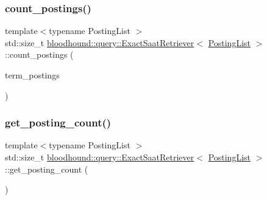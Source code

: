 \subsubsection{\texorpdfstring{count\+\_\+postings()}{count\_postings()}}
{\footnotesize\ttfamily template$<$typename Posting\+List $>$ \\
std\+::size\+\_\+t \mbox{\hyperlink{classbloodhound_1_1query_1_1ExactSaatRetriever}{bloodhound\+::query\+::\+Exact\+Saat\+Retriever}}$<$ \mbox{\hyperlink{classbloodhound_1_1PostingList}{Posting\+List}} $>$\+::count\+\_\+postings (\begin{DoxyParamCaption}\item[{const std\+::vector$<$ \mbox{\hyperlink{classbloodhound_1_1PostingList}{Posting\+List}} $>$ \&}]{term\+\_\+postings }\end{DoxyParamCaption})\hspace{0.3cm}{\ttfamily [inline]}}

\mbox{\label{classbloodhound_1_1query_1_1ExactSaatRetriever_a43b6bd8cdc3a64c5eabf778230c53419}} 
\subsubsection{\texorpdfstring{get\+\_\+posting\+\_\+count()}{get\_posting\_count()}}
{\footnotesize\ttfamily template$<$typename Posting\+List $>$ \\
std\+::size\+\_\+t \mbox{\hyperlink{classbloodhound_1_1query_1_1ExactSaatRetriever}{bloodhound\+::query\+::\+Exact\+Saat\+Retriever}}$<$ \mbox{\hyperlink{classbloodhound_1_1PostingList}{Posting\+List}} $>$\+::get\+\_\+posting\+\_\+count (\begin{DoxyParamCaption}{ }\end{DoxyParamCaption})\hspace{0.3cm}{\ttfamily [inline]}}

\mbox{\label{classbloodhound_1_1query_1_1ExactSaatRetriever_a5d3a882f8f117130a4be46e711397e3c}} 
